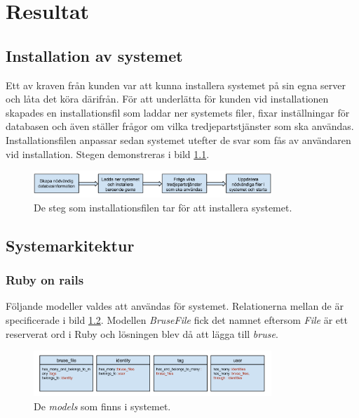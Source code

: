 \chapter{Resultat}

\section{Installation av systemet}
Ett av kraven från kunden var att kunna installera systemet på sin egna server
och låta det köra därifrån. För att underlätta för kunden vid installationen
skapades en installationsfil som laddar ner systemets filer, fixar inställningar
för databasen och även ställer frågor om vilka tredjepartstjänster som ska
användas. Installationsfilen anpassar sedan systemet utefter de svar som fås av
användaren vid installation. Stegen demonstreras i bild \ref{fig:installation}.

\begin{figure}[!h]
\centering
\includegraphics[width=0.8\textwidth]{figures/installation.png}
\caption{De steg som installationsfilen tar för att installera systemet.}
\label{fig:installation}
\end{figure}

\section{Systemarkitektur}

\subsection{Ruby on rails}
Följande modeller valdes att användas för systemet. Relationerna mellan de är
specificerade i bild \ref{fig:models}. Modellen \emph{BruseFile} fick det namnet
eftersom \emph{File} är ett reserverat ord i Ruby och lösningen blev då att
lägga till \emph{bruse}.

\begin{figure}[!h]
\centering
\includegraphics[width=0.8\textwidth]{figures/models.png}
\caption{De \emph{models} som finns i systemet.}
\label{fig:models}
\end{figure}

